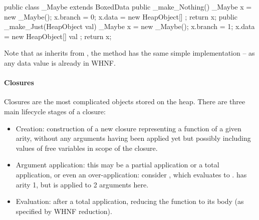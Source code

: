 \documentclass[dissertation.tex]{subfiles}
\begin{document}
{{{{                \begin{javafigure}
                public class _Maybe extends BoxedData {
                    public _make_Nothing() {
                        _Maybe x = new _Maybe();
                        x.branch = 0;
                        x.data = new HeapObject[] {};
                        return x;
                    }
                    public _make_Just(HeapObject val) {
                        _Maybe x = new _Maybe();
                        x.branch = 1;
                        x.data = new HeapObject[] { val };
                        return x;
                    }
                }
                \end{javafigure}

                Note that as  inherits from , the  method has the same simple
                implementation -- as any data value is already in WHNF.

            }
            \paragraph*{Closures}
            {

                Closures are the most complicated objects stored on the heap. There are three main lifecycle stages of a
                closure:

                \begin{itemize}
                \item
                {
                    Creation: construction of a new closure representing a function of a given arity, without any
                    arguments having been applied yet but possibly including values of free variables in scope of the
                    closure.
                }
                \item
                {
                    
                    Argument application: this may be a partial application or a total application, or even an
                    over-application: consider , which evaluates to .  has
                    arity 1, but is applied to 2 arguments here.

                }
                \item
                {
                    Evaluation: after a total application, reducing the function to its body (as specified by WHNF
                    reduction).
                }
                \end{itemize}

}}}}
\end{document}
